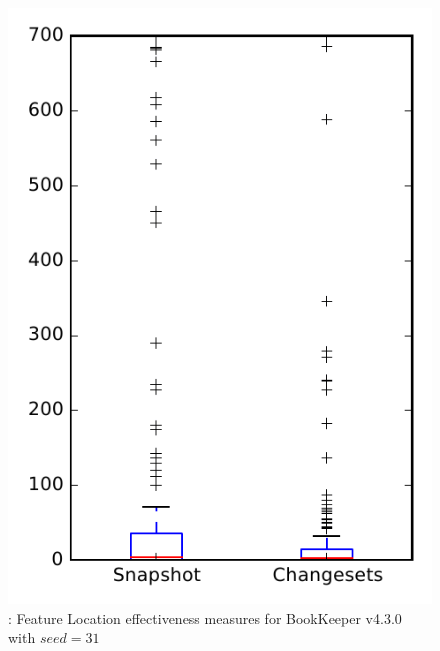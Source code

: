 
\begin{figure}
\centering
\includegraphics[height=0.4\textheight]{figures/flt_seed/rq1_bookkeeper_31}
\caption{\rone: Feature Location effectiveness measures for BookKeeper v4.3.0 with $seed=31$}
\label{fig:flt_seed:rq1:bookkeeper}
\end{figure}
